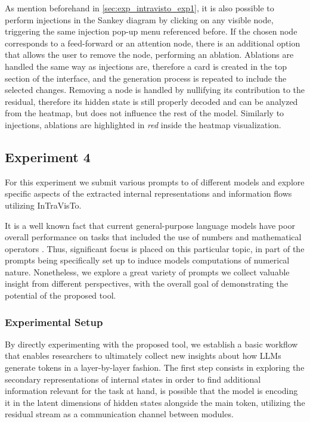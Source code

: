 As mention beforehand in \cref{sec:exp_intravisto_exp1}, it is also possible to perform injections in the Sankey diagram by clicking on any visible node, triggering the same injection pop-up menu referenced before.
If the chosen node corresponds to a feed-forward  or an attention node, there is an additional option that allows the user to remove the node, performing an ablation.
Ablations are handled the same way as injections are, therefore a card is created in the top section of the interface, and the generation process is repeated to include the selected changes.
Removing a node is handled by nullifying its contribution to the residual, therefore its hidden state is still properly decoded and can be analyzed from the heatmap, but does not influence the rest of the model.
Similarly to injections, ablations are highlighted in \emph{red} inside the heatmap visualization.

\subsection{Experiment 4}\label{sec:exp_intravisto_exp4}

For this experiment we submit various prompts to  of different models and explore specific aspects of the extracted internal representations and information flows utilizing InTraVisTo.

It is a well known fact that current general-purpose language models have  poor overall performance on tasks that included the use of numbers and mathematical operators .
Thus, significant focus is placed on this particular topic,  in part of the prompts being specifically set up to induce models  computations of numerical nature.
Nonetheless, we explore a great variety of prompts  we collect valuable insight from different perspectives, with the overall goal of demonstrating the potential of the proposed tool.

\subsubsection{Experimental Setup}

By directly experimenting with the proposed tool, we establish a basic workflow that enables researchers to ultimately collect new insights about how LLMs generate tokens in a layer-by-layer fashion.
The first step consists in exploring the secondary representations of internal states in order to find additional information relevant for the task at hand,  is possible that the model is encoding it in the latent dimensions of hidden states alongside the main token, utilizing the residual stream as a communication channel between modules.


